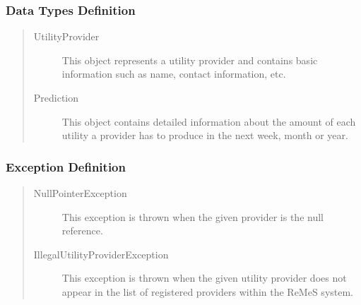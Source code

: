 \subsubsection{Data Types Definition}

\begin{quote}
	\begin{description}
		\item[UtilityProvider] This object represents a utility provider and contains
		basic information such as name, contact information, etc.
		\item[Prediction] This object contains detailed information about
		the amount of each utility a provider has to produce in the next week, month
		or year.
	\end{description} 
\end{quote}

\subsubsection{Exception Definition} 

\begin{quote}
	\begin{description}
		\item[NullPointerException] This exception is thrown when the given provider
		is the null reference.
		\item[IllegalUtilityProviderException] This exception is thrown when the given
		utility provider does not appear in the list of registered providers within
		the ReMeS system.
	\end{description} 
\end{quote}